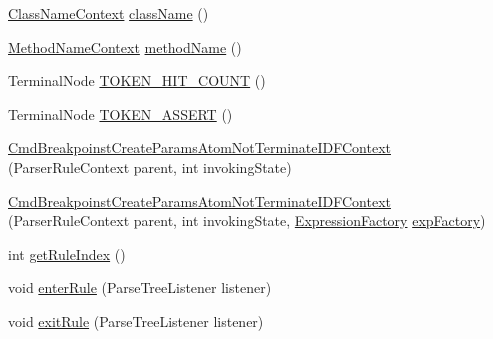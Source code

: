 \begin{DoxyCompactItemize}
\item 
\hyperlink{classgov_1_1nasa_1_1jpf_1_1inspector_1_1server_1_1expression_1_1parser_1_1_expression_grammar_parser_1_1_class_name_context}{Class\+Name\+Context} \hyperlink{classgov_1_1nasa_1_1jpf_1_1inspector_1_1server_1_1expression_1_1parser_1_1_expression_grammar_paee196826319d0ea00470866a7ffd8d7b_a807a1d54b12e42c9a7b80a0f19fd3118}{class\+Name} ()
\item 
\hyperlink{classgov_1_1nasa_1_1jpf_1_1inspector_1_1server_1_1expression_1_1parser_1_1_expression_grammar_parser_1_1_method_name_context}{Method\+Name\+Context} \hyperlink{classgov_1_1nasa_1_1jpf_1_1inspector_1_1server_1_1expression_1_1parser_1_1_expression_grammar_paee196826319d0ea00470866a7ffd8d7b_ab10888cb435b2195a29e1acf05a9d289}{method\+Name} ()
\item 
Terminal\+Node \hyperlink{classgov_1_1nasa_1_1jpf_1_1inspector_1_1server_1_1expression_1_1parser_1_1_expression_grammar_paee196826319d0ea00470866a7ffd8d7b_a8e23066dd13594ee45a31cbdfb4ebe49}{T\+O\+K\+E\+N\+\_\+\+H\+I\+T\+\_\+\+C\+O\+U\+NT} ()
\item 
Terminal\+Node \hyperlink{classgov_1_1nasa_1_1jpf_1_1inspector_1_1server_1_1expression_1_1parser_1_1_expression_grammar_paee196826319d0ea00470866a7ffd8d7b_ab30468f222dac61325daa2a2336947d8}{T\+O\+K\+E\+N\+\_\+\+A\+S\+S\+E\+RT} ()
\item 
\hyperlink{classgov_1_1nasa_1_1jpf_1_1inspector_1_1server_1_1expression_1_1parser_1_1_expression_grammar_paee196826319d0ea00470866a7ffd8d7b_a3a2b9e190ebeecf8278dc89f426ac54a}{Cmd\+Breakpoinst\+Create\+Params\+Atom\+Not\+Terminate\+I\+D\+F\+Context} (Parser\+Rule\+Context parent, int invoking\+State)
\item 
\hyperlink{classgov_1_1nasa_1_1jpf_1_1inspector_1_1server_1_1expression_1_1parser_1_1_expression_grammar_paee196826319d0ea00470866a7ffd8d7b_ab0285d52ed82d12fbac3c1c32515a904}{Cmd\+Breakpoinst\+Create\+Params\+Atom\+Not\+Terminate\+I\+D\+F\+Context} (Parser\+Rule\+Context parent, int invoking\+State, \hyperlink{classgov_1_1nasa_1_1jpf_1_1inspector_1_1server_1_1expression_1_1_expression_factory}{Expression\+Factory} \hyperlink{classgov_1_1nasa_1_1jpf_1_1inspector_1_1server_1_1expression_1_1parser_1_1_expression_grammar_paee196826319d0ea00470866a7ffd8d7b_a1ab7d67462957fac341c0827224a00d8}{exp\+Factory})
\item 
int \hyperlink{classgov_1_1nasa_1_1jpf_1_1inspector_1_1server_1_1expression_1_1parser_1_1_expression_grammar_paee196826319d0ea00470866a7ffd8d7b_ab310ca067ad22a9be6fac1a13f09bad2}{get\+Rule\+Index} ()
\item 
void \hyperlink{classgov_1_1nasa_1_1jpf_1_1inspector_1_1server_1_1expression_1_1parser_1_1_expression_grammar_paee196826319d0ea00470866a7ffd8d7b_af5dae9a7b5cbaa9f7465e3f7240cdf7d}{enter\+Rule} (Parse\+Tree\+Listener listener)
\item 
void \hyperlink{classgov_1_1nasa_1_1jpf_1_1inspector_1_1server_1_1expression_1_1parser_1_1_expression_grammar_paee196826319d0ea00470866a7ffd8d7b_abff45f79390a3ccdca05115b8adaac7a}{exit\+Rule} (Parse\+Tree\+Listener listener)
\end{DoxyCompactItemize}
